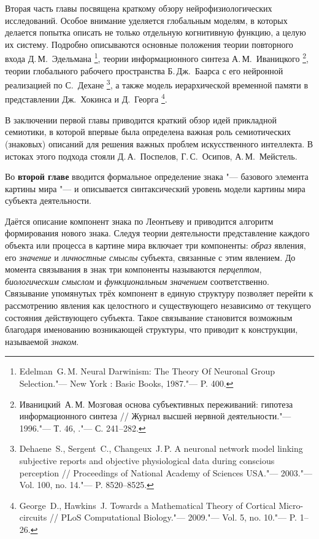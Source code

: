 Вторая часть главы посвящена краткому обзору нейрофизиологических исследований. Особое внимание уделяется глобальным моделям, в которых делается попытка описать не только отдельную когнитивную функцию, а целую их систему. Подробно описываются основные положения теории повторного входа Д.\,М.~Эдельмана \footnote{Edelman~G.\,M. Neural Darwinism: The Theory Of Neuronal Group Selection."--- New York : Basic Books, 1987."--- P. 400.}, теории информационного синтеза А.\,М.~Иваницкого \footnote{Иваницкий~А.\,М. Мозговая основа субъективных переживаний: гипотеза информационного синтеза // Журнал высшей нервной деятельности."--- 1996."---	Т. 46, ."--- С. 241--282.}, теории глобального рабочего пространства Б.\,Дж.~Баарса с его нейронной реализацией по С.~Дехане \footnote{Dehaene~S., Sergent~C., Changeux~J.\,P. A neuronal network model linking subjective reports and objective physiological data during conscious perception // Proceedings of National	Academy of Sciences USA."--- 2003."--- Vol. 100, no. 14."--- P. 8520--8525.}, а также модель иерархической временной памяти в представлении Дж.~Хокинса и Д.~Георга \footnote{George~D., Hawkins~J. Towards a Mathematical Theory of Cortical Micro-circuits // PLoS Computational Biology."--- 2009."--- Vol. 5, no. 10."--- P. 1--26.}.

В заключении первой главы приводится краткий обзор идей прикладной семиотики, в которой впервые была определена важная роль семиотических (знаковых) описаний для решения важных проблем искусственного интеллекта. В истоках этого подхода стояли Д.\,А.~Поспелов, Г.\,С.~Осипов, А.\,М.~Мейстель.

Во \textbf{второй главе} вводится формальное определение знака "--- базового элемента картины мира "--- и описывается синтаксический уровень модели картины мира субъекта деятельности.

Даётся описание компонент знака по Леонтьеву и приводится алгоритм формирования нового знака. Следуя теории деятельности представление каждого объекта или процесса в картине мира включает три компоненты: \textit{образ} явления, его \textit{значение} и \textit{личностные смыслы} субъекта, связанные с этим явлением. До момента связывания в знак три компоненты называются \textit{перцептом}, \textit{биологическим смыслом} и \textit{функциональным значением} соответственно. Связывание упомянутых трёх компонент в единую структуру позволяет перейти к рассмотрению явления как целостного и существующего независимо от текущего состояния действующего субъекта. Такое связывание становится возможным благодаря именованию возникающей структуры, что приводит к конструкции, называемой \textit{знаком}.

